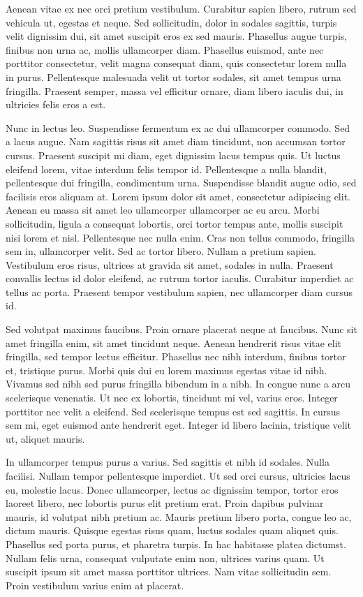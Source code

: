 \documentclass{report}
\begin{document}
Aenean vitae ex nec orci pretium vestibulum. Curabitur sapien libero, rutrum sed vehicula ut, egestas et neque. Sed sollicitudin, dolor in sodales sagittis, turpis velit dignissim dui, sit amet suscipit eros ex sed mauris. Phasellus augue turpis, finibus non urna ac, mollis ullamcorper diam. Phasellus euismod, ante nec porttitor consectetur, velit magna consequat diam, quis consectetur lorem nulla in purus. Pellentesque malesuada velit ut tortor sodales, sit amet tempus urna fringilla. Praesent semper, massa vel efficitur ornare, diam libero iaculis dui, in ultricies felis eros a est.

Nunc in lectus leo. Suspendisse fermentum ex ac dui ullamcorper commodo. Sed a lacus augue. Nam sagittis risus sit amet diam tincidunt, non accumsan tortor cursus. Praesent suscipit mi diam, eget dignissim lacus tempus quis. Ut luctus eleifend lorem, vitae interdum felis tempor id. Pellentesque a nulla blandit, pellentesque dui fringilla, condimentum urna. Suspendisse blandit augue odio, sed facilisis eros aliquam at.
Lorem ipsum dolor sit amet, consectetur adipiscing elit. Aenean eu massa sit amet leo ullamcorper ullamcorper ac eu arcu. Morbi sollicitudin, ligula a consequat lobortis, orci tortor tempus ante, mollis suscipit nisi lorem et nisl. Pellentesque nec nulla enim. Cras non tellus commodo, fringilla sem in, ullamcorper velit. Sed ac tortor libero. Nullam a pretium sapien. Vestibulum eros risus, ultrices at gravida sit amet, sodales in nulla. Praesent convallis lectus id dolor eleifend, ac rutrum tortor iaculis. Curabitur imperdiet ac tellus ac porta. Praesent tempor vestibulum sapien, nec ullamcorper diam cursus id.

Sed volutpat maximus faucibus. Proin ornare placerat neque at faucibus. Nunc sit amet fringilla enim, sit amet tincidunt neque. Aenean hendrerit risus vitae elit fringilla, sed tempor lectus efficitur. Phasellus nec nibh interdum, finibus tortor et, tristique purus. Morbi quis dui eu lorem maximus egestas vitae id nibh. Vivamus sed nibh sed purus fringilla bibendum in a nibh. In congue nunc a arcu scelerisque venenatis. Ut nec ex lobortis, tincidunt mi vel, varius eros. Integer porttitor nec velit a eleifend. Sed scelerisque tempus est sed sagittis. In cursus sem mi, eget euismod ante hendrerit eget. Integer id libero lacinia, tristique velit ut, aliquet mauris.

In ullamcorper tempus purus a varius. Sed sagittis et nibh id sodales. Nulla facilisi. Nullam tempor pellentesque imperdiet. Ut sed orci cursus, ultricies lacus eu, molestie lacus. Donec ullamcorper, lectus ac dignissim tempor, tortor eros laoreet libero, nec lobortis purus elit pretium erat. Proin dapibus pulvinar mauris, id volutpat nibh pretium ac. Mauris pretium libero porta, congue leo ac, dictum mauris. Quisque egestas risus quam, luctus sodales quam aliquet quis. Phasellus sed porta purus, et pharetra turpis. In hac habitasse platea dictumst. Nullam felis urna, consequat vulputate enim non, ultrices varius quam. Ut suscipit ipsum sit amet massa porttitor ultrices. Nam vitae sollicitudin sem. Proin vestibulum varius enim at placerat.
\end{document}
